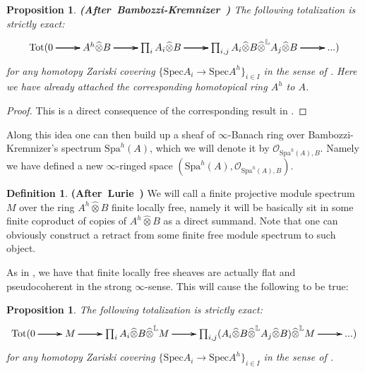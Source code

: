 \documentclass[12pt]{amsart}
\newtheorem{proposition}[theorem]{Proposition}
\theoremstyle{definition}
\newtheorem{definition}[theorem]{Definition}
\numberwithin{equation}{section}
\begin{document}
\begin{proposition}\mbox{\bf{(After Bambozzi-Kremnizer \cite[Theorem 4.15]{BK1})}} 
The following totalization is strictly exact:
\[
\xymatrix@C+0pc@R+0pc{
\mathrm{Tot}(0  \ar[r]\ar[r]\ar[r] &A^h\widehat{\otimes} B \ar[r]\ar[r]\ar[r] & \prod_i A_i\widehat{\otimes} B \ar[r]\ar[r]\ar[r] &\prod_{i,j} A_i\widehat{\otimes} B \widehat{\otimes}^\mathbb{L} A_j\widehat{\otimes}B\ar[r]\ar[r]\ar[r] &...)
}
\]
for any homotopy Zariski covering $\{\mathrm{Spec}A_i\rightarrow \mathrm{Spec}A^h\}_{i\in I}$ in the sense of \cite[Theorem 4.15]{BK1}. Here we have already attached the corresponding homotopical ring $A^h$ to $A$.
\end{proposition}


\begin{proof}
This is a direct consequence of the corresponding result in \cite[Theorem 4.15]{BK1}.	
\end{proof}

\indent Along this idea one can then build up a sheaf of $\infty$-Banach ring over Bambozzi-Kremnizer's spectrum $\mathrm{Spa}^h(A)$, which we will denote it by $\mathcal{O}_{\mathrm{Spa}^h(A),B}$. Namely we have defined a new $\infty$-ringed space $(\mathrm{Spa}^h(A),\mathcal{O}_{\mathrm{Spa}^h(A),B})$.

\begin{definition} \mbox{\bf{(After Lurie \cite[Definition 2.9.1.1]{Lu1})}} We will call a finite projective module spectrum $M$ over the ring $A^h\widehat{\otimes}B$ finite locally free, namely it will be basically sit in some finite coproduct of copies of $A^h\widehat{\otimes}B$ as a direct summand. Note that one can obviously construct a retract from some finite free module spectrum to such object.
	
\end{definition}


\indent As in \cite[Proposition 7.2.4.20]{Lu2}, we have that finite locally free sheaves are actually flat and pseudocoherent in the strong $\infty$-sense. This will cause the following to be true:



\begin{proposition} 
The following totalization is strictly exact:
\[
\xymatrix@C+0pc@R+0pc{
\mathrm{Tot}(0  \ar[r]\ar[r]\ar[r] &M \ar[r]\ar[r]\ar[r] & \prod_i A_i\widehat{\otimes} B \widehat{\otimes}^\mathbb{L} M  \ar[r]\ar[r]\ar[r] &\prod_{i,j} (A_i\widehat{\otimes} B \widehat{\otimes}^\mathbb{L} A_j\widehat{\otimes}B) \widehat{\otimes}^\mathbb{L} M\ar[r]\ar[r]\ar[r] &...)
}
\]
for any homotopy Zariski covering $\{\mathrm{Spec}A_i\rightarrow \mathrm{Spec}A^h\}_{i\in I}$ in the sense of \cite[Theorem 2.15, Theorem 4.15]{BK1}. 
\end{proposition}
\end{document}
